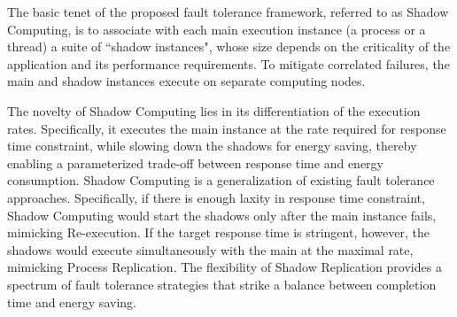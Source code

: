 
The basic tenet of the proposed fault tolerance framework, referred to as Shadow Computing, is to associate with each main execution instance (a process or a thread) a suite of ``shadow instances", whose size depends on the criticality of the application and its performance requirements. 
To mitigate correlated failures, the main and shadow instances
execute on separate computing nodes.

The novelty of Shadow Computing lies in its differentiation of the execution rates. Specifically, it 
executes the main instance at the rate required for response time constraint, while slowing down the shadows for energy saving, thereby enabling a parameterized trade-off between response time and energy consumption.
Shadow Computing is a generalization of existing fault tolerance
approaches. %
Specifically, if there is enough laxity in response time constraint, Shadow
Computing would start the shadows only after the main instance fails, mimicking Re-execution. %
If the target response time is
stringent, however, %
the shadows would execute simultaneously with the main at the maximal
rate, mimicking Process Replication. The flexibility of Shadow Replication provides a spectrum
of fault tolerance strategies that strike a
balance between completion time and energy saving.


